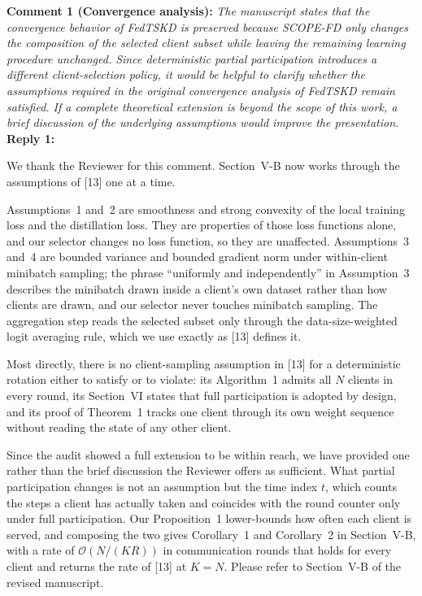 \documentclass[10pt]{article}
\begin{document}

\noindent
\textbf{Comment 1 (Convergence analysis):} \textit{The manuscript states that the convergence behavior of FedTSKD is preserved because SCOPE-FD only changes the composition of the selected client subset while leaving the remaining learning procedure unchanged. Since deterministic partial participation introduces a different client-selection policy, it would be helpful to clarify whether the assumptions required in the original convergence analysis of FedTSKD remain satisfied. If a complete theoretical extension is beyond the scope of this work, a brief discussion of the underlying assumptions would improve the presentation.} \\
\noindent
\textbf{Reply 1:} {We thank the Reviewer for this comment. Section~V-B now works through the assumptions of [13] one at a time.

Assumptions~1 and~2 are smoothness and strong convexity of the local training loss and the distillation loss. They are properties of those loss functions alone, and our selector changes no loss function, so they are unaffected. Assumptions~3 and~4 are bounded variance and bounded gradient norm under within-client minibatch sampling; the phrase ``uniformly and independently'' in Assumption~3 describes the minibatch drawn inside a client's own dataset rather than how clients are drawn, and our selector never touches minibatch sampling. The aggregation step reads the selected subset only through the data-size-weighted logit averaging rule, which we use exactly as [13] defines it.

Most directly, there is no client-sampling assumption in [13] for a deterministic rotation either to satisfy or to violate: its Algorithm~1 admits all $N$ clients in every round, its Section~VI states that full participation is adopted by design, and its proof of Theorem~1 tracks one client through its own weight sequence without reading the state of any other client.

Since the audit showed a full extension to be within reach, we have provided one rather than the brief discussion the Reviewer offers as sufficient. What partial participation changes is not an assumption but the time index $t$, which counts the steps a client has actually taken and coincides with the round counter only under full participation. Our Proposition~1 lower-bounds how often each client is served, and composing the two gives Corollary~1 and Corollary~2 in Section~V-B, with a rate of $\mathcal{O}(N/(KR))$ in communication rounds that holds for every client and returns the rate of [13] at $K=N$. Please refer to Section~V-B of the revised manuscript.}\\
\end{document}
